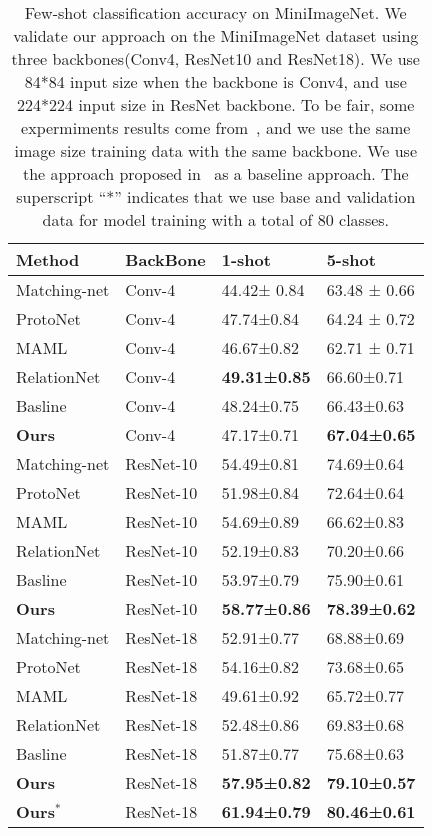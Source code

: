 \documentclass[runningheads]{llncs}
\begin{document}
\begin{table}
\caption{Few-shot classification accuracy on MiniImageNet. We validate our approach on the MiniImageNet dataset using three backbones(Conv4, ResNet10 and ResNet18). We use 84*84 input size when the backbone is Conv4, and use 224*224 input size in ResNet backbone. To be fair, some expermiments results come from~\cite{chen2019closer}, and we use the same image size training data with the same backbone. We use the approach proposed in~\cite{chen2019closer} as a baseline approach. The superscript “*” indicates that we use base and validation data for model training with a total of 80 classes.}\label{tab1}
\centering
\begin{tabular}{|l|l|l|l|}
\hline
Method  & BackBone & 1-shot & 5-shot\\
\hline
Matching-net  & Conv-4 & 44.42± 0.84 & 63.48 ± 0.66\\
ProtoNet  & Conv-4 & 47.74±0.84 & 64.24 ± 0.72\\
MAML  & Conv-4 & 46.67±0.82 & 62.71 ± 0.71\\
RelationNet  & Conv-4 & \bfseries 49.31±0.85 & 66.60±0.71\\
Basline  & Conv-4 & 48.24±0.75 & 66.43±0.63\\
\bfseries Ours  & Conv-4 & 47.17±0.71 &\bfseries 67.04±0.65\\
Matching-net  & ResNet-10 & 54.49±0.81 & 74.69±0.64\\
ProtoNet & ResNet-10 & 51.98±0.84 & 72.64±0.64\\
MAML  & ResNet-10 & 54.69±0.89 & 66.62±0.83\\
RelationNet & ResNet-10 & 52.19±0.83 & 70.20±0.66\\
Basline & ResNet-10 & 53.97±0.79 & 75.90±0.61\\
\bfseries Ours & ResNet-10 & \bfseries 58.77±0.86 &\bfseries 78.39±0.62\\
Matching-net & ResNet-18 & 52.91±0.77 & 68.88±0.69\\
ProtoNet & ResNet-18 & 54.16±0.82 & 73.68±0.65\\
MAML  & ResNet-18 & 49.61±0.92 & 65.72±0.77\\
RelationNet & ResNet-18 & 52.48±0.86 & 69.83±0.68\\
Basline  & ResNet-18 & 51.87±0.77 & 75.68±0.63\\
\bfseries Ours & ResNet-18 & \bfseries 57.95±0.82 &\bfseries 79.10±0.57\\
\bfseries Ours$^{*}$  & ResNet-18 & \bfseries 61.94±0.79 &\bfseries80.46±0.61\\
\hline
\end{tabular}
\end{table}
\end{document}
